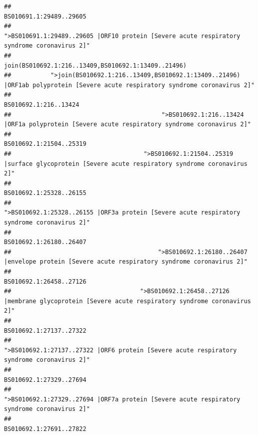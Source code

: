\documentclass[
]{article}
\begin{document}
\begin{verbatim}
##                                                                                                                BS010691.1:29489..29605 
##                                            ">BS010691.1:29489..29605 |ORF10 protein [Severe acute respiratory syndrome coronavirus 2]" 
##                                                                                    join(BS010692.1:216..13409,BS010692.1:13409..21496) 
##           ">join(BS010692.1:216..13409,BS010692.1:13409..21496) |ORF1ab polyprotein [Severe acute respiratory syndrome coronavirus 2]" 
##                                                                                                                  BS010692.1:216..13424 
##                                          ">BS010692.1:216..13424 |ORF1a polyprotein [Severe acute respiratory syndrome coronavirus 2]" 
##                                                                                                                BS010692.1:21504..25319 
##                                     ">BS010692.1:21504..25319 |surface glycoprotein [Severe acute respiratory syndrome coronavirus 2]" 
##                                                                                                                BS010692.1:25328..26155 
##                                            ">BS010692.1:25328..26155 |ORF3a protein [Severe acute respiratory syndrome coronavirus 2]" 
##                                                                                                                BS010692.1:26180..26407 
##                                         ">BS010692.1:26180..26407 |envelope protein [Severe acute respiratory syndrome coronavirus 2]" 
##                                                                                                                BS010692.1:26458..27126 
##                                    ">BS010692.1:26458..27126 |membrane glycoprotein [Severe acute respiratory syndrome coronavirus 2]" 
##                                                                                                                BS010692.1:27137..27322 
##                                             ">BS010692.1:27137..27322 |ORF6 protein [Severe acute respiratory syndrome coronavirus 2]" 
##                                                                                                                BS010692.1:27329..27694 
##                                            ">BS010692.1:27329..27694 |ORF7a protein [Severe acute respiratory syndrome coronavirus 2]" 
##                                                                                                                BS010692.1:27691..27822 

\end{verbatim}
\end{document}
